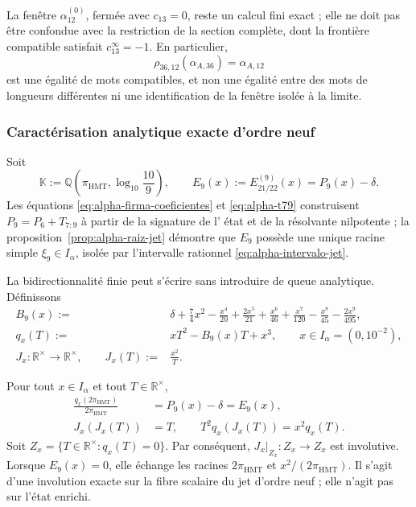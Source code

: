 La fenêtre \(\alpha_{12}^{(0)}\), fermée avec \(c_{13}=0\), reste un
calcul fini exact ; elle ne doit pas être confondue avec la restriction de la section
complète, dont la frontière compatible satisfait \(c_{13}^{\infty}=-1\). En
particulier,
\begin{equation}
 \rho_{36,12}(\alpha_{A,36})=\alpha_{A,12}
 \label{eq:alpha-rho-36-12-proyectiva}
\end{equation}
est une égalité de mots compatibles, et non une égalité entre des mots de
longueurs différentes ni une identification de la fenêtre isolée à la
limite.

\subsubsection{Caractérisation analytique exacte d'ordre neuf}

Soit
\[
 \mathbb K:=\mathbb Q\!\left(\pi_{\mathrm{HMT}},
                  \log_{10}\frac{10}{9}\right),
 \qquad
 E_9(x):=E_{21/22}^{(9)}(x)=P_9(x)-\delta .
\]
Les équations \eqref{eq:alpha-firma-coeficientes} et
\eqref{eq:alpha-t79} construisent \(P_9=P_6+T_{7:9}\) à partir de la signature de l'
état et de la résolvante nilpotente ; la
proposition~\ref{prop:alpha-raiz-jet} démontre que \(E_9\) possède une unique
racine simple \(\xi_9\in I_\alpha\), isolée par l'intervalle rationnel
\eqref{eq:alpha-intervalo-jet}.

La bidirectionnalité finie peut s'écrire sans introduire de queue
analytique. Définissons
\begin{align}
 B_9(x):={}&\delta+\frac74x^2-\frac{x^4}{20}
 +\frac{2x^5}{21}+\frac{x^6}{46}+\frac{x^7}{120}
 -\frac{x^8}{45}-\frac{2x^9}{495},
 \label{eq:alpha-b9-finito}\\
 q_x(T):={}&xT^2-B_9(x)T+x^3,\qquad x\in I_\alpha=(0,10^{-2}),
 \label{eq:alpha-q-involucion-finita}\\
 J_x:{\mathbb R}^{\times}\longrightarrow{\mathbb R}^{\times},
 \qquad J_x(T):={}&\frac{x^2}{T}.
\end{align}

\begin{proposition}
\label{prop:alpha-involucion-finita-exacta}
Pour tout \(x\in I_\alpha\) et tout \(T\in\mathbb R^\times\),
\begin{align}
 \frac{q_x(2\pi_{\mathrm{HMT}})}{2\pi_{\mathrm{HMT}}}
 &=P_9(x)-\delta=E_9(x),
 \label{eq:alpha-q-equivale-p9}\\
 J_x(J_x(T))&=T,
 \qquad
 T^2q_x(J_x(T))=x^2q_x(T).
 \label{eq:alpha-j-involucion-exacta}
\end{align}
Soit \(Z_x=\{T\in\mathbb R^\times:q_x(T)=0\}\). Par conséquent,
\(J_x|_{Z_x}:Z_x\to Z_x\) est involutive. Lorsque \(E_9(x)=0\),
elle échange les racines \(2\pi_{\mathrm{HMT}}\) et
\(x^2/(2\pi_{\mathrm{HMT}})\). Il s'agit d'une involution exacte sur la fibre
scalaire du jet d'ordre neuf ; elle n'agit pas sur l'état enrichi.
\end{proposition}

